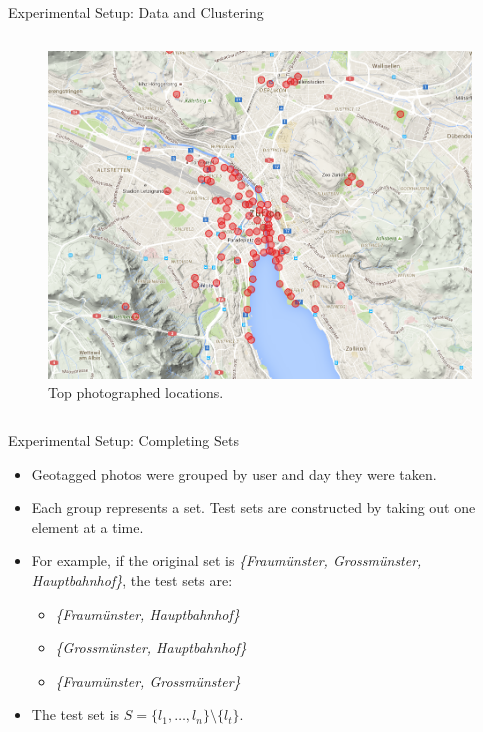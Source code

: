 \documentclass{beamer}
\begin{document}
\begin{frame}{Experimental Setup: Data and Clustering}
\begin{columns}
\begin{column}{0.45\textwidth}
\begin{figure}
        \includegraphics[width=\textwidth]{top_100_zurich}
        \caption{Top photographed locations.}
      \end{figure}
    \end{column}
  \end{columns}
\end{frame}

\begin{frame}{Experimental Setup: Completing Sets}
  \begin{itemize}
    \item Geotagged photos were grouped by user and day they were taken.
    \item Each group represents a set. Test sets are constructed by taking out one element at a time.
    \item For example, if the original set is \textit{\{Fraumünster, Grossmünster, Hauptbahnhof\}}, the test sets are:
      \begin{itemize}
        \item \textit{\{Fraumünster, Hauptbahnhof\}}
        \item \textit{\{Grossmünster, Hauptbahnhof\}}
        \item \textit{\{Fraumünster, Grossmünster\}}
      \end{itemize}
    \item The test set is $S = \{l_{1}, \dots, l_{n}\} \setminus \{l_{t}\}$.
  \end{itemize}
\end{frame}
\end{document}
